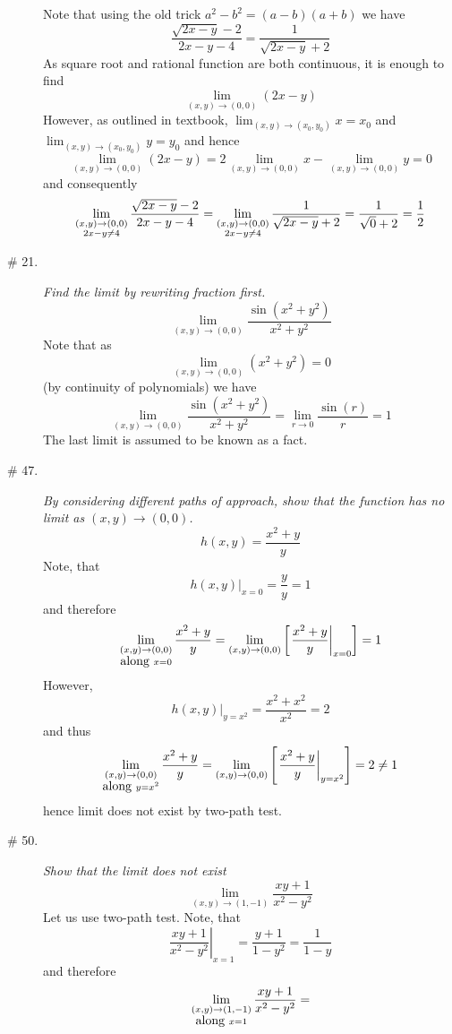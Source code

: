 \documentclass[8pt]{article} %
\begin{document}
\begin{description}
{		Note that using the old trick $a^2-b^2=(a-b)(a+b)$ we have
		\[\frac{\sqrt{2x-y}-2}{2x-y-4}=\frac{1}{\sqrt{2x-y}+2}\]
		As square root and rational function are both continuous, it is enough to find \[\lim_{(x,y)\to(0,0)}(2x-y)\]
		However, as outlined in textbook, $\lim_{(x,y)\to(x_0,y_0)}x=x_0$ and $\lim_{(x,y)\to(x_0,y_0)}y=y_0$ and hence
		\[\lim_{(x,y)\to(0,0)}(2x-y)=2\lim_{(x,y)\to(0,0)}x-\lim_{(x,y)\to(0,0)}y=0\]
		and consequently
		\[\lim_{\begin{subarray}{c}(x,y)\to(0,0)\\2x-y\neq4\end{subarray}}\frac{\sqrt{2x-y}-2}{2x-y-4}
			=\lim_{\begin{subarray}{c}(x,y)\to(0,0)\\2x-y\neq4\end{subarray}}\frac{1}{\sqrt{2x-y}+2}=\frac{
				1}{\sqrt{0}+2}=\frac{1}{2}\]
		}
	\item[\# 21.]{{\it Find the limit by rewriting fraction first.}
		\[\lim_{(x,y)\to(0,0)}\frac{\sin(x^2+y^2)}{x^2+y^2}\]
		Note that as \[\lim_{(x,y)\to(0,0)}(x^2+y^2)=0\]
		(by continuity of polynomials) we have
		\[\lim_{(x,y)\to(0,0)}\frac{\sin(x^2+y^2)}{x^2+y^2}=\lim_{r\to 0}\frac{\sin(r)}{r}=1\]
		The last limit is assumed to be known as a fact.
		}
	\item[\# 47.]{{\it By considering different paths of approach, show that the function has no limit as $(x,y)\to(0,0)$.
		\[h(x,y)=\frac{x^2+y}{y}\]}
		Note, that \[h(x,y)\bigg|_{x=0}=\frac{y}{y}=1\]
		and therefore
		\[\lim_{\begin{subarray}{c}(x,y)\to(0,0)\\\mbox{along }x=0\end{subarray}}\frac{x^2+y}{y}=
			\lim_{(x,y)\to(0,0)}\mysbra{\left.\frac{x^2+y}{y}\right|_{x=0}}=1\]
		However, \[\left.h(x,y)\right|_{y=x^2}=\frac{x^2+x^2}{x^2}=2\]
		and thus
		\[\lim_{\begin{subarray}{c}(x,y)\to(0,0)\\\mbox{along }y=x^2\end{subarray}}\frac{x^2+y}{y}=
			\lim_{(x,y)\to(0,0)}\mysbra{\left.\frac{x^2+y}{y}\right|_{y=x^2}}=2\neq 1\]
		hence limit does not exist by two-path test.
		}
	\item[\# 50.]{
		\newcommand{\f}{\frac{xy+1}{x^2-y^2}}
		{\it Show that the limit does not exist \[\lim_{(x,y)\to(1,-1)}\frac{xy+1}{x^2-y^2}\]
		}
		Let us use two-path test. Note, that 
		\[\left.\f\right|_{x=1}=\frac{y+1}{1-y^2}=\frac{1}{1-y}\]
		and therefore
		\[\lim_{\begin{subarray}{c}(x,y)\to(1,-1)\\\mbox{along }x=1\end{subarray}}\f=
\]}
\end{description}
\end{document}
